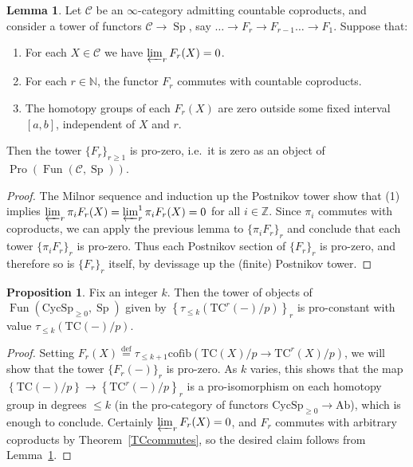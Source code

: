 \documentclass{amsart}
\theoremstyle{definition}
\newtheorem{proposition}[definition]{Proposition}
\newtheorem{lemma}[definition]{Lemma}
\newcommand{\CycSp}{\mathrm{CycSp}}
\newcommand{\TC}{\mathrm{TC}}
\begin{document}
\begin{lemma} 
\label{invlim02}
Let $\mathcal{C}$ be an $\infty$-category admitting countable coproducts, and consider a tower of functors $\mathcal{C}\rightarrow \operatorname{Sp}$, say $\ldots \rightarrow F_r\rightarrow F_{r-1}\ldots \rightarrow F_1$.  Suppose that:
\begin{enumerate}
\item For each $X\in\mathcal{C}$ we have $\varprojlim_r F_r(X) = 0$.
\item For each $r\in\mathbb{N}$, the functor $F_r$ commutes with countable coproducts.
\item The homotopy groups of each $F_r(X)$ are zero outside some fixed interval $[a,b]$, independent of $X$ and $r$.
\end{enumerate}
Then the tower $\{F_r\}_{r \geq 1}$ is pro-zero, i.e.\ it is zero as
an object of $\operatorname{Pro}(\operatorname{Fun}(\mathcal{C},\operatorname{Sp}))$.\end{lemma} 
\begin{proof} 
The Milnor sequence and induction up the Postnikov tower show that (1) implies
$\varprojlim_r \pi_i F_r(X) = \varprojlim^1_r \pi_i F_r(X) = 0$ for all $i\in\mathbb{Z}$.  Since $\pi_i$ commutes with coproducts, we can apply the previous lemma to $\{\pi_i F_r\}_r$ and conclude that each tower $\{\pi_i F_r\}_r$ is pro-zero.  Thus each Postnikov section of $\{F_r\}_r$ is pro-zero, and therefore so is $\{F_r\}_r$ itself, by devissage up the (finite) Postnikov tower.
\end{proof} 

\begin{proposition} \label{prop_pro_constant}
Fix an integer $k$. Then the tower of objects of $\operatorname{Fun}(\CycSp_{\geq 0},\operatorname{Sp})$ given by $ \left\{ \tau_{\leq k}(\TC^r(-)/p)\right\}_{r}$ is pro-constant with value
$\tau_{\leq k}(\TC(-)/p)$. 
\end{proposition} 
\begin{proof} 
Setting $F_{r}(X) \stackrel{\mathrm{def}}{=} \tau_{\leq k+1}\mathrm{cofib}( \TC(X)/p \to
\TC^r(X)/p)$, we will show that the tower $\{F_{r}(-)\}_r$ is pro-zero.
As $k$ varies, this shows that the map 
$\left\{\TC(-)/p\right\} \to \left\{\TC^r(-)/p\right\}_r$ is a pro-isomorphism
on each homotopy group in degrees $\leq k$ (in the pro-category of functors $\CycSp_{\geq 0} \to \mathrm{Ab}$), which
is enough to conclude. 
Certainly $\varprojlim_r F_{r}(X) = 0$, and $F_r$ commutes with arbitrary
coproducts by Theorem~\ref{TCcommutes}, so the desired claim follows from
Lemma~\ref{invlim02}. 
\end{proof} 
\end{document}
